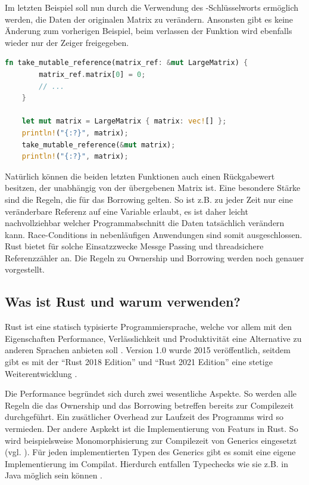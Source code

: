 \documentclass[11pt,a4paper, ngerman]{article}
\begin{document}
Im letzten Beispiel soll nun durch die Verwendung des -Schlüsselworts ermöglich werden, die Daten der originalen Matrix zu verändern. Ansonsten gibt es keine Änderung zum vorherigen Beispiel, beim verlassen der Funktion wird ebenfalls wieder nur der Zeiger freigegeben.

\begin{lstlisting}[language=rust, caption={Einführendes Beispiel Veränderliche Referenz}]
    fn take_mutable_reference(matrix_ref: &mut LargeMatrix) {
        matrix_ref.matrix[0] = 0;
        // ...
    }

    let mut matrix = LargeMatrix { matrix: vec![] };
    println!("{:?}", matrix);
    take_mutable_reference(&mut matrix);
    println!("{:?}", matrix);
\end{lstlisting}

Natürlich können die beiden letzten Funktionen auch einen Rückgabewert besitzen, der unabhängig von der übergebenen Matrix ist. Eine besondere Stärke sind die Regeln, die für das Borrowing gelten. So ist z.B. zu jeder Zeit nur eine veränderbare Referenz auf eine Variable erlaubt, es ist daher leicht nachvollziehbar welcher Programmabschnitt die Daten tatsächlich verändern kann. Race-Conditions in nebenläufigen Anwendungen sind somit ausgeschlossen. Rust bietet für solche Einsatzzwecke Messge Passing \cite{K1727} und threadsichere Referenzzähler \cite{ArcSrc} an. Die Regeln zu Ownership und Borrowing werden noch genauer vorgestellt.

\label{sec:kap2d2}
\subsection{Was ist Rust und warum verwenden?}
Rust ist eine statisch typisierte Programmiersprache, welche vor allem mit den Eigenschaften Performance, Verlässlichkeit und Produktivität eine Alternative zu anderen Sprachen anbieten soll \cite{RustPromises}. Version 1.0 wurde 2015 veröffentlich, seitdem gibt es mit der ``Rust 2018 Edition'' und ``Rust 2021 Edition'' eine stetige Weiterentwicklung \cite{RustEditions}.

Die Performance begründet sich durch zwei wesentliche Aspekte. So werden alle Regeln die das Ownership und das Borrowing betreffen bereits zur Compilezeit durchgeführt. Ein zusätlicher Overhead zur Laufzeit des Programms wird so vermieden. Der andere Aspkekt ist die Implementierung von Featurs in Rust. So wird beispielsweise Monomorphisierung zur Compilezeit von Generics eingesetzt (vgl. \cite[S. 196 ff.]{SK19}). Für jeden implementierten Typen des Generics gibt es somit eine eigene Implementierung im Compilat. Hierdurch entfallen Typechecks wie sie z.B. in Java möglich sein können \cite{JavaGenerics}.
\end{document}
